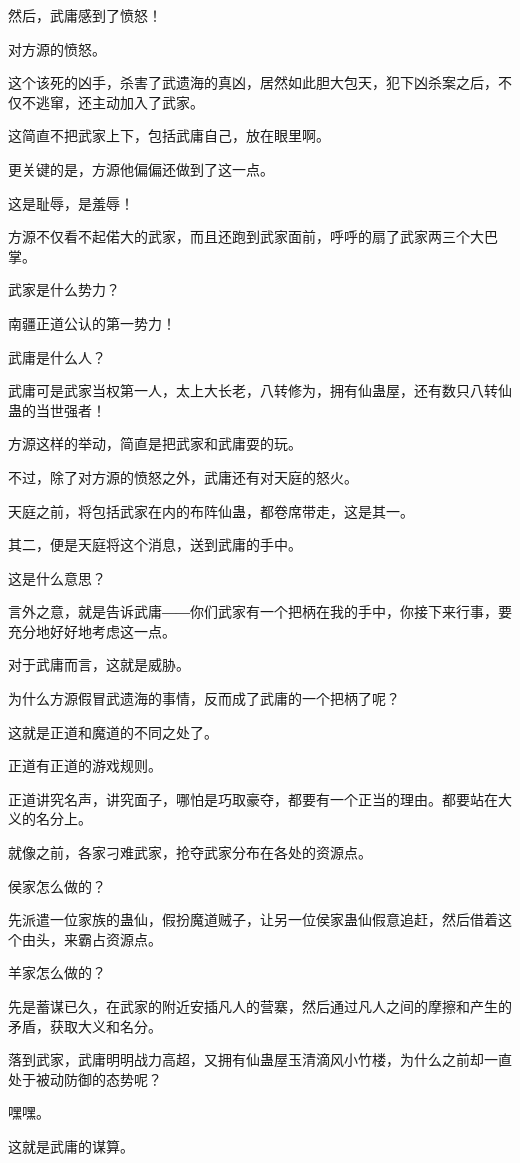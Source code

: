 \begin{this_body}
然后，武庸感到了愤怒！

对方源的愤怒。

这个该死的凶手，杀害了武遗海的真凶，居然如此胆大包天，犯下凶杀案之后，不仅不逃窜，还主动加入了武家。

这简直不把武家上下，包括武庸自己，放在眼里啊。

更关键的是，方源他偏偏还做到了这一点。

这是耻辱，是羞辱！

方源不仅看不起偌大的武家，而且还跑到武家面前，呼呼的扇了武家两三个大巴掌。

武家是什么势力？

南疆正道公认的第一势力！

武庸是什么人？

武庸可是武家当权第一人，太上大长老，八转修为，拥有仙蛊屋，还有数只八转仙蛊的当世强者！

方源这样的举动，简直是把武家和武庸耍的玩。

不过，除了对方源的愤怒之外，武庸还有对天庭的怒火。

天庭之前，将包括武家在内的布阵仙蛊，都卷席带走，这是其一。

其二，便是天庭将这个消息，送到武庸的手中。

这是什么意思？

言外之意，就是告诉武庸――你们武家有一个把柄在我的手中，你接下来行事，要充分地好好地考虑这一点。

对于武庸而言，这就是威胁。

为什么方源假冒武遗海的事情，反而成了武庸的一个把柄了呢？

这就是正道和魔道的不同之处了。

正道有正道的游戏规则。

正道讲究名声，讲究面子，哪怕是巧取豪夺，都要有一个正当的理由。都要站在大义的名分上。

就像之前，各家刁难武家，抢夺武家分布在各处的资源点。

侯家怎么做的？

先派遣一位家族的蛊仙，假扮魔道贼子，让另一位侯家蛊仙假意追赶，然后借着这个由头，来霸占资源点。

羊家怎么做的？

先是蓄谋已久，在武家的附近安插凡人的营寨，然后通过凡人之间的摩擦和产生的矛盾，获取大义和名分。

落到武家，武庸明明战力高超，又拥有仙蛊屋玉清滴风小竹楼，为什么之前却一直处于被动防御的态势呢？

嘿嘿。

这就是武庸的谋算。


\end{this_body}
